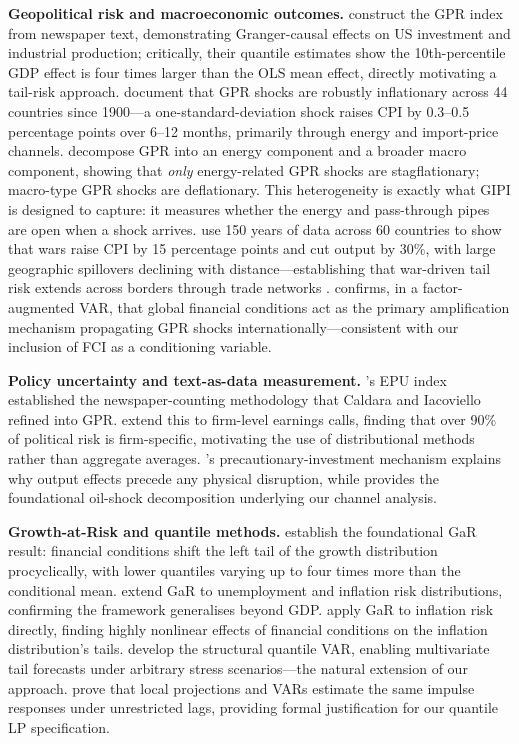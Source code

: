 \documentclass[12pt]{article}
\begin{document}
\noindent\textbf{Geopolitical risk and macroeconomic outcomes.}
\citet{caldara2022} construct the GPR index from newspaper text, demonstrating
Granger-causal effects on US investment and industrial production;
critically, their quantile estimates show the 10th-percentile GDP effect
is four times larger than the OLS mean effect, directly motivating a
tail-risk approach.
\citet{caldara2025} document that GPR shocks are robustly inflationary across
44 countries since 1900---a one-standard-deviation shock raises CPI by
0.3--0.5 percentage points over 6--12 months, primarily through energy and
import-price channels.
\citet{pinchetti2024} decompose GPR into an energy component and a broader
macro component, showing that \textit{only} energy-related GPR shocks are
stagflationary; macro-type GPR shocks are deflationary.
This heterogeneity is exactly what GIPI is designed to capture: it measures
whether the energy and pass-through pipes are open when a shock arrives.
\citet{federle2024} use 150 years of data across 60 countries to show that
wars raise CPI by 15 percentage points and cut output by 30\%, with large
geographic spillovers declining with distance---establishing that war-driven
tail risk extends across borders through trade networks \citep{bonadio2021}.
\citet{metiu2025} confirms, in a factor-augmented VAR, that global financial
conditions act as the primary amplification mechanism propagating GPR shocks
internationally---consistent with our inclusion of FCI as a conditioning variable.

\noindent\textbf{Policy uncertainty and text-as-data measurement.}
\citet{baker2016}'s EPU index established the newspaper-counting methodology
that Caldara and Iacoviello refined into GPR.
\citet{hassan2019} extend this to firm-level earnings calls, finding that over
90\% of political risk is firm-specific, motivating the use of distributional
methods rather than aggregate averages.
\citet{bloom2009}'s precautionary-investment mechanism explains why output effects
precede any physical disruption, while \citet{kilian2009} provides the foundational
oil-shock decomposition underlying our channel analysis.

\noindent\textbf{Growth-at-Risk and quantile methods.}
\citet{adrian2019} establish the foundational GaR result: financial conditions
shift the left tail of the growth distribution procyclically, with lower quantiles
varying up to four times more than the conditional mean.
\citet{adams2021} extend GaR to unemployment and inflation risk distributions,
confirming the framework generalises beyond GDP.
\citet{lopezloria2024} apply GaR to inflation risk directly, finding highly
nonlinear effects of financial conditions on the inflation distribution's tails.
\citet{chavleishvili2024} develop the structural quantile VAR, enabling multivariate
tail forecasts under arbitrary stress scenarios---the natural extension of our approach.
\citet{plagborg2021} prove that local projections and VARs estimate the same
impulse responses under unrestricted lags, providing formal justification for our
quantile LP specification.
\end{document}
